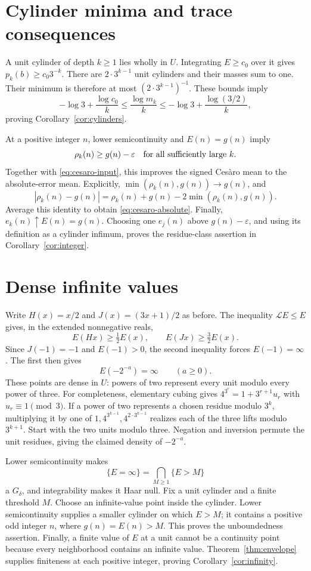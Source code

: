 \documentclass[11pt]{article}
\theoremstyle{remark}
\newcommand{\LL}{\mathcal L}
\begin{document}
\section{Cylinder minima and trace consequences}

A unit cylinder of depth \(k\geq1\) lies wholly in \(U\).
Integrating \(E\geq c_0\) over it gives
\(p_k(b)\geq c_0 3^{-k}\).
There are \(2\cdot3^{k-1}\) unit cylinders and their masses sum
to one. Their minimum is therefore at most
\((2\cdot3^{k-1})^{-1}\). These bounds imply
\[
 -\log3+\frac{\log c_0}{k}
 \leq \frac{\log m_k}{k}
 \leq -\log3+\frac{\log(3/2)}{k},
\]
proving Corollary~\ref{cor:cylinders}.

At a positive integer \(n\), lower semicontinuity and
\(E(n)=g(n)\) imply
\[
 \rho_k(n)\geq g(n)-\varepsilon
 \quad\hbox{for all sufficiently large }k.
\]
Together with \eqref{eq:cesaro-input}, this improves the signed
Ces\`aro mean to the absolute-error mean. Explicitly,
\(\min(\rho_k(n),g(n))\to g(n)\), and
\[
 |\rho_k(n)-g(n)|
 =\rho_k(n)+g(n)-2\min(\rho_k(n),g(n)).
\]
Average this identity to obtain \eqref{eq:cesaro-absolute}.
Finally, \(e_k(n)\uparrow E(n)=g(n)\). Choosing one \(e_j(n)\)
above \(g(n)-\varepsilon\), and using its definition as a
cylinder infimum, proves the residue-class assertion in
Corollary~\ref{cor:integer}.

\section{Dense infinite values}

Write \(H(x)=x/2\) and \(J(x)=(3x+1)/2\) as before.
The inequality \(\LL E\leq E\) gives, in the extended
nonnegative reals,
\[
 E(Hx)\geq\tfrac12 E(x),\qquad
 E(Jx)\geq\tfrac32 E(x).
\]
Since \(J(-1)=-1\) and \(E(-1)>0\), the second inequality
forces \(E(-1)=\infty\). The first then gives
\[
 E(-2^{-a})=\infty\qquad(a\geq0).
\]
These points are dense in \(U\): powers of two represent every
unit modulo every power of three. For completeness, elementary
cubing gives
\(4^{3^r}=1+3^{r+1}u_r\) with \(u_r\equiv1\pmod3\).
If a power of two represents a chosen residue modulo \(3^k\),
multiplying it by one of
\(1,4^{3^{k-1}},4^{2\cdot3^{k-1}}\) realizes each of the three
lifts modulo \(3^{k+1}\). Start with the two units modulo three.
Negation and inversion permute the unit residues, giving the
claimed density of \(-2^{-a}\).

Lower semicontinuity makes
\[
 \{E=\infty\}=\bigcap_{M\geq1}\{E>M\}
\]
a \(G_\delta\), and integrability makes it Haar null. Fix a unit
cylinder and a finite threshold \(M\). Choose an infinite-value
point inside the cylinder. Lower semicontinuity supplies a smaller
cylinder on which \(E>M\); it contains a positive odd integer
\(n\), where \(g(n)=E(n)>M\). This proves the unboundedness
assertion. Finally, a finite value of \(E\) at a unit cannot be
a continuity point because every neighborhood contains an infinite
value. Theorem~\ref{thm:envelope} supplies finiteness at each
positive integer, proving Corollary~\ref{cor:infinity}.
\end{document}

